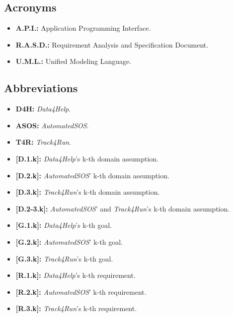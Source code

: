    \subsection{Acronyms}
        \begin{itemize}
            \item \textbf{A.P.I.:} Application Programming Interface.
        
            \item \textbf{R.A.S.D.:} Requirement Analysis and Specification Document.
            
            \item \textbf{U.M.L.:} Unified Modeling Language.
        \end{itemize}
        
    \subsection{Abbreviations}
        \begin{itemize}
            \item \textbf{D4H:} \emph{Data4Help}.
            
            \item \textbf{ASOS:} \emph{AutomatedSOS}.
            
            \item \textbf{T4R:} \emph{Track4Run}.
            
            \item \textbf{[D.1.k]:} \emph{Data4Help}'s k-th domain assumption.
            
            \item \textbf{[D.2.k]:} \emph{AutomatedSOS}' k-th domain assumption.
            
            \item \textbf{[D.3.k]:} \emph{Track4Run}'s k-th domain assumption.
            
            \item  \textbf{[D.2-3.k]:} \emph{AutomatedSOS}' and \emph{Track4Run}'s k-th domain assumption.
            
            \item \textbf{[G.1.k]:} \emph{Data4Help}'s k-th goal.
            
            \item \textbf{[G.2.k]:} \emph{AutomatedSOS}' k-th goal.
            
            \item \textbf{[G.3.k]:} \emph{Track4Run}'s k-th goal.
            
            \item \textbf{[R.1.k]:} \emph{Data4Help}'s k-th requirement.
            
            \item \textbf{[R.2.k]:} \emph{AutomatedSOS}' k-th requirement.
            
            \item \textbf{[R.3.k]:} \emph{Track4Run}'s k-th requirement.
        \end{itemize}